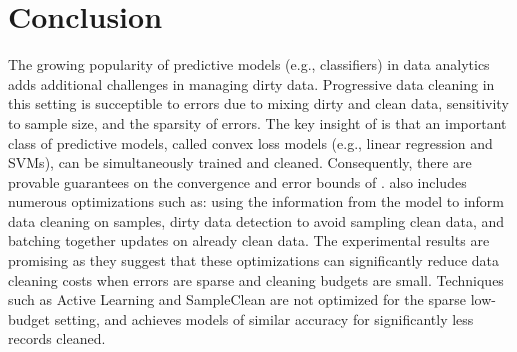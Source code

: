 \vspace{-1em}
\section{Conclusion}
The growing popularity of predictive models (e.g., classifiers) in data analytics adds additional challenges in managing dirty data.
Progressive data cleaning in this setting is succeptible to errors due to mixing dirty and clean data, sensitivity to sample size, and the sparsity of errors.
The key insight of \sys is that an important class of predictive models, called convex loss models (e.g., linear regression and SVMs), can be simultaneously trained and cleaned.
Consequently, there are provable guarantees on the convergence and error bounds of \sys.  
\sys also includes numerous optimizations such as: using the information from the model to inform data cleaning on samples, dirty data detection to avoid sampling clean data, and batching together updates on already clean data.
The experimental results are promising as they suggest that these optimizations can significantly reduce data cleaning costs when errors are sparse and cleaning budgets are small.
Techniques such as Active Learning and SampleClean are not optimized for the sparse low-budget setting, and \sys achieves models of similar accuracy for significantly less records cleaned.
